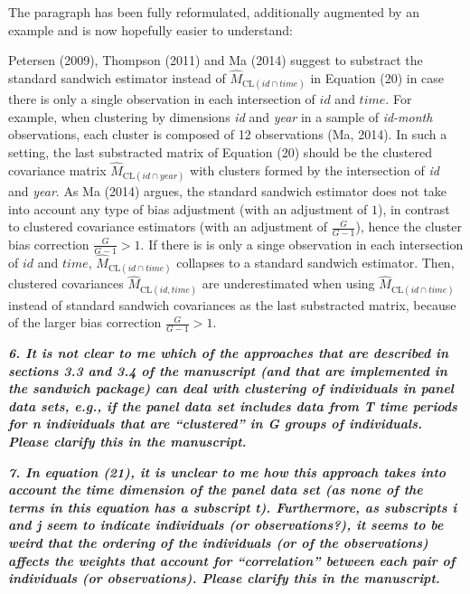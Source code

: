 \documentclass[10pt,a4paper]{article}
\begin{document}
\medskip

The paragraph has been fully reformulated, additionally augmented by an example and is now hopefully easier to understand:

Petersen (2009), Thompson (2011) and Ma (2014)
suggest to substract the standard sandwich estimator instead of $\hat M_{\mathrm{CL}(id \cap time)}$ in Equation (20) in case there is only a single
observation in each intersection of $id$ and $time$.
For example, when clustering by dimensions \emph{id} and \emph{year} in a sample
of \emph{id-month} observations, each cluster is composed of 12 observations (Ma, 2014). In such a setting, the last substracted matrix of Equation (20) should be the clustered covariance matrix  $\hat M_{\mathrm{CL}(id \cap year)}$
with clusters formed by the intersection of \emph{id} and \emph{year}.
As Ma (2014) argues, the standard sandwich estimator does not take into
account any type of bias adjustment (with an adjustment of $1$), in contrast to clustered covariance estimators (with an adjustment of $\frac{G}{G-1}$), hence the cluster bias correction  $\frac{G}{G-1} > 1$. If there is is only a singe observation in each intersection of $id$ and $time$, $\hat M_{\mathrm{CL}(id \cap time)}$ collapses to a standard sandwich estimator. Then, clustered covariances $\hat M_{\mathrm{CL}(id,time)}$ are underestimated when using $\hat M_{\mathrm{CL}(id \cap time)}$ instead of standard sandwich covariances as the last substracted matrix, because of the larger bias correction $\frac{G}{G-1} > 1$.

\medskip

\textbf{\textit{6. It is not clear to me which of the approaches that are described in sections 3.3 and 3.4
of the manuscript (and that are implemented in the sandwich package) can deal with clustering of individuals in panel data sets, e.g., if the panel data set includes data from T time periods for n individuals that are ``clustered'' in G groups of individuals. Please clarify this in the manuscript.}}

\medskip

\textbf{\textit{7. In equation (21), it is unclear to me how this approach takes into account the time
dimension of the panel data set (as none of the terms in this equation has a subscript t).
Furthermore, as subscripts i and j seem to indicate individuals (or observations?), it
seems to be weird that the ordering of the individuals (or of the observations) affects the
weights that account for ``correlation'' between each pair of individuals (or observations).
Please clarify this in the manuscript.}}
\end{document}
